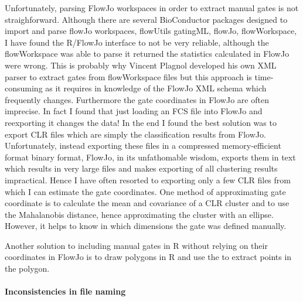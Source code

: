 Unfortunately, parsing FlowJo workspaces in order to extract manual gates is not straighforward.
Although there are several BioConductor packages designed to import and parse flowJo workspaces, flowUtils gatingML, flowJo, flowWorkspace,
I have found the R/FlowJo interface to not be very reliable, although the flowWorkspace was able to parse it returned the statistics calculated in FlowJo were wrong.
This is probably why Vincent Plagnol developed his own XML parser to extract gates from flowWorkspace files but this approach is time-consuming as it requires in knowledge of the FlowJo XML schema which frequently changes.
Furthermore the gate coordinates in FlowJo are often imprecise.
In fact I found that just loading an FCS file into FlowJo and reexporting it changes the data!
In the end I found the best solution was to export CLR files which are simply the classification results from FlowJo.
Unfortunately, instead exporting these files in a compressed memory-efficient format binary format, FlowJo, in its unfathomable wisdom, exports them in text which results in very large files and makes exporting of all clustering results impractical.
Hence I have often resorted to exporting only a few CLR files from which I can estimate the gate coordinates.
One method of approximating gate coordinate is to calculate the mean and covariance of a CLR cluster and to use the Mahalanobis distance,
hence approximating the cluster with an ellipse.
However, it helps to know in which dimensions the gate was defined manually.

Another solution to including manual gates in R without relying on their coordinates in FlowJo
is to draw polygons in R and use the  to extract points in the polygon.
\paragraph{Inconsistencies in file naming}


